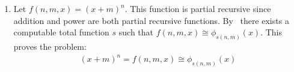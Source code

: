 \begin{enumerate}[label=]
    \item 
    Let $f(n, m, x) = (x + m)^n$. This function is partial recursive since addition and power are both partial recursive functions. By \smn\ there exists a computable total function $s$ such that $f(n, m, x) \cong \phi_{s(n,m)}(x)$. This proves the problem:
    \begin{gather*}
        (x + m)^n = f(n, m, x) \cong \phi_{s(n, m)}(x)
    \end{gather*}
\end{enumerate}